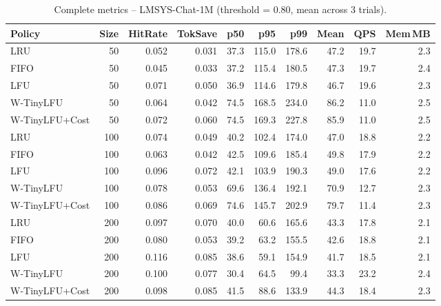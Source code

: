 \documentclass[11pt,a4paper]{article}
\begin{document}
\begin{table}[H]
\centering
\caption{Complete metrics -- LMSYS-Chat-1M (threshold = 0.80, mean across 3 trials).}
\label{tab:full_lmsys080}
\scriptsize
\setlength{\tabcolsep}{3pt}
\begin{tabular}{@{} l r rrrr rr rr @{}}
\toprule
\textbf{Policy} & \textbf{Size} & \textbf{HitRate} & \textbf{TokSave} & \textbf{p50} & \textbf{p95} & \textbf{p99} & \textbf{Mean} & \textbf{QPS} & \textbf{Mem\,MB} \\
\midrule
LRU              & 50  & 0.052 & 0.031 & 37.3 & 115.0 & 178.6 & 47.2 & 19.7 & 2.3 \\
FIFO             & 50  & 0.045 & 0.033 & 37.2 & 115.4 & 180.5 & 47.3 & 19.7 & 2.4 \\
LFU              & 50  & 0.071 & 0.050 & 36.9 & 114.6 & 179.8 & 46.7 & 19.6 & 2.3 \\
W-TinyLFU        & 50  & 0.064 & 0.042 & 74.5 & 168.5 & 234.0 & 86.2 & 11.0 & 2.5 \\
W-TinyLFU+Cost   & 50  & 0.072 & 0.060 & 74.5 & 169.3 & 227.8 & 85.9 & 11.0 & 2.5 \\
\midrule
LRU              & 100 & 0.074 & 0.049 & 40.2 & 102.4 & 174.0 & 47.0 & 18.8 & 2.2 \\
FIFO             & 100 & 0.063 & 0.042 & 42.5 & 109.6 & 185.4 & 49.8 & 17.9 & 2.2 \\
LFU              & 100 & 0.096 & 0.072 & 42.1 & 103.9 & 190.3 & 49.0 & 17.6 & 2.2 \\
W-TinyLFU        & 100 & 0.078 & 0.053 & 69.6 & 136.4 & 192.1 & 70.9 & 12.7 & 2.3 \\
W-TinyLFU+Cost   & 100 & 0.086 & 0.069 & 74.6 & 145.7 & 202.9 & 79.7 & 11.4 & 2.3 \\
\midrule
LRU              & 200 & 0.097 & 0.070 & 40.0 & 60.6  & 165.6 & 43.3 & 17.8 & 2.1 \\
FIFO             & 200 & 0.080 & 0.053 & 39.2 & 63.2  & 155.5 & 42.6 & 18.8 & 2.1 \\
LFU              & 200 & 0.116 & 0.085 & 38.6 & 59.1  & 154.9 & 41.7 & 18.5 & 2.1 \\
W-TinyLFU        & 200 & 0.100 & 0.077 & 30.4 & 64.5  & 99.4  & 33.3 & 23.2 & 2.4 \\
W-TinyLFU+Cost   & 200 & 0.098 & 0.085 & 41.5 & 88.6  & 133.9 & 44.3 & 18.4 & 2.3 \\
\bottomrule
\end{tabular}
\end{table}
\end{document}
